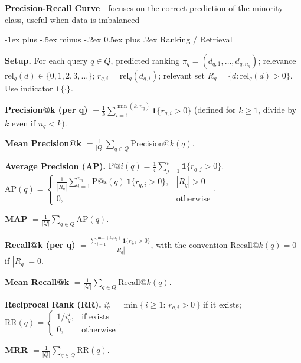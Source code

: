 \documentclass[10pt,landscape]{article}
\makeatletter
\renewcommand{\subsection}{\@startsection{subsection}{2}{0mm}%
                                {-1ex plus -.5ex minus -.2ex}%
                                {0.5ex plus .2ex}%
                                {\normalfont\normalsize\bfseries}}
\makeatother
\begin{document}
\begin{multicols}{3}
    \textbf{Precision-Recall Curve} - focuses on the correct prediction of the minority class, useful when data is imbalanced

    \subsection{Ranking / Retrieval}
    \newcommand{\ind}{\mathbf{1}}

    \textbf{Setup.} For each query $q\in Q$, predicted ranking $\pi_q=(d_{q,1},\ldots,d_{q,n_q})$; relevance $\mathrm{rel}_q(d)\in\{0,1,2,3,\ldots\}$; $r_{q,i}=\mathrm{rel}_q(d_{q,i})$; relevant set $R_q=\{d:\mathrm{rel}_q(d)>0\}$. Use indicator $\ind\{\cdot\}$.
    \vspace{.2em}

    \textbf{Precision@k (per q)} $=\frac{1}{k}\sum_{i=1}^{\min(k,n_q)} \ind\{r_{q,i}>0\}$ (defined for $k\ge1$, divide by $k$ even if $n_q<k$). \quad

    \textbf{Mean Precision@k} $=\frac{1}{|Q|}\sum_{q\in Q}\mathrm{Precision@}k(q)$.
    \vspace{.2em}

    \textbf{Average Precision (AP).} $\mathrm{P@}i(q)=\frac{1}{i}\sum_{j=1}^{i}\ind\{r_{q,j}>0\}$. \;
    $\mathrm{AP}(q)=\begin{cases}\frac{1}{|R_q|}\sum_{i=1}^{n_q}\mathrm{P@}i(q)\,\ind\{r_{q,i}>0\}, & |R_q|>0\\[3pt] 0,& \text{otherwise}\end{cases}$.\;

    \textbf{MAP} $=\frac{1}{|Q|}\sum_{q\in Q}\mathrm{AP}(q)$.
    \vspace{.2em}

    \textbf{Recall@k (per q)} $=\frac{\sum_{i=1}^{\min(k,n_q)} \ind\{r_{q,i}>0\}}{|R_q|}$, with the convention $\mathrm{Recall@}k(q)=0$ if $|R_q|=0$. \quad

    \textbf{Mean Recall@k} $=\frac{1}{|Q|}\sum_{q\in Q}\mathrm{Recall@}k(q)$.
    \vspace{.2em}

    \textbf{Reciprocal Rank (RR).} $i_q^\star=\min\{\,i\ge1:\,r_{q,i}>0\,\}$ if it exists; $\mathrm{RR}(q)=\begin{cases}1/i_q^\star,& \text{if exists}\\[2pt]0,& \text{otherwise}\end{cases}$.\;

    \textbf{MRR} $=\frac{1}{|Q|}\sum_{q\in Q}\mathrm{RR}(q)$.
    \vspace{.2em}


\end{multicols}
\end{document}
